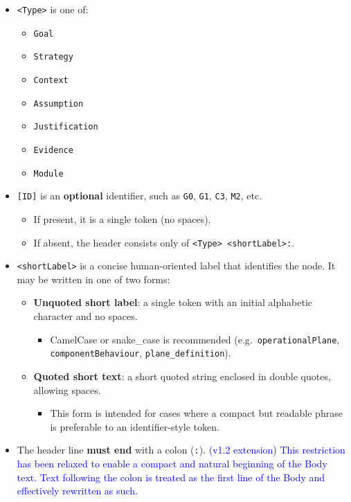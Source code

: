\documentclass[11pt,twoside,a4paper]{article}
\begin{document}
\begin{itemize}[leftmargin=2em]
  \item \texttt{\textless Type\textgreater{}} is one of:
  \begin{itemize}[leftmargin=1.5em]
    \item \texttt{Goal}
    \item \texttt{Strategy}
    \item \texttt{Context}
    \item \texttt{Assumption}
    \item \texttt{Justification}
    \item \texttt{Evidence}
    \item \texttt{Module}
  \end{itemize}

  \item \texttt{[ID]} is an \textbf{optional} identifier, such as \texttt{G0}, \texttt{G1}, \texttt{C3}, \texttt{M2}, etc.
  \begin{itemize}[leftmargin=1.5em]
    \item If present, it is a single token (no spaces).
    \item If absent, the header consists only of \texttt{\textless Type\textgreater{} \textless shortLabel\textgreater:}.
  \end{itemize}

  \item \texttt{\textless shortLabel\textgreater{}} is a concise human-oriented label that identifies the node.
  It may be written in one of two forms:
  \begin{itemize}[leftmargin=1.5em]
    \item \textbf{Unquoted short label}: a single token with an initial alphabetic character and no spaces.
    \begin{itemize}[leftmargin=1.5em]
      \item CamelCase or snake\_case is recommended (e.g.\ \texttt{operationalPlane}, \texttt{componentBehaviour}, \texttt{plane\_definition}).
    \end{itemize}
    \item \textbf{Quoted short text}: a short quoted string enclosed in double quotes, allowing spaces.
    \begin{itemize}[leftmargin=1.5em]
      \item This form is intended for cases where a compact but readable phrase is preferable to an identifier-style token.
    \end{itemize}
  \end{itemize}

  \item The header line \textbf{must end} with a colon (\texttt{:}). 
  \textcolor{blue}{(v1.2 extension) This restriction has been relaxed to enable a compact and natural beginning of the Body text. Text following the colon is treated as the first line of the Body and effectively rewritten as such.}
\end{itemize}
\end{document}

